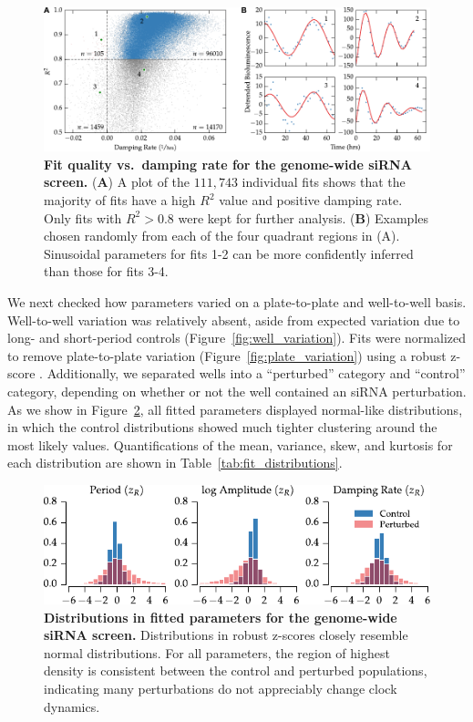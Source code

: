\documentclass[11pt, letterpaper]{article}
\begin{document}
\begin{figure}[tbp]
  \begin{center}
    \includegraphics[]{figures/pdfs/r2_vs_damping.pdf}
  \end{center}
  \caption{{\bfseries Fit quality vs.\ damping rate for the genome-wide siRNA screen.}
({\bfseries A}) A plot of the $111,743$ individual fits shows that the majority of fits have a high $R^2$ value and positive damping rate. Only fits with $R^2 > 0.8$ were kept for further analysis.
({\bfseries B}) Examples chosen randomly from each of the four quadrant regions in (A). Sinusoidal parameters for fits 1-2 can be more confidently inferred than those for fits 3-4.}
\label{fig:fit_quality}
\end{figure}

We next checked how parameters varied on a plate-to-plate and well-to-well basis.
Well-to-well variation was relatively absent, aside from expected variation due to long- and short-period controls (Figure~\ref{fig:well_variation}).
Fits were normalized to remove plate-to-plate variation (Figure~\ref{fig:plate_variation}) using a robust z-score \cite{Birmingham2009}.
Additionally, we separated wells into a ``perturbed'' category and ``control'' category, depending on whether or not the well contained an siRNA perturbation.
As we show in Figure~\ref{fig:fit_distributions}, all fitted parameters displayed normal-like distributions, in which the control distributions showed much tighter clustering around the most likely values.
Quantifications of the mean, variance, skew, and kurtosis for each distribution are shown in Table~\ref{tab:fit_distributions}.

\begin{figure}[tbp]
  \begin{center}
    \includegraphics[]{figures/pdfs/fitted_parameters.pdf}
  \end{center}
  \caption{{\bfseries Distributions in fitted parameters for the genome-wide siRNA screen.} Distributions in robust z-scores closely resemble normal distributions. For all parameters, the region of highest density is consistent between the control and perturbed populations, indicating many perturbations do not appreciably change clock dynamics. } 
\label{fig:fit_distributions}
\end{figure}
\end{document}

